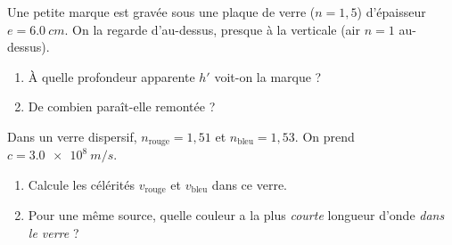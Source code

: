 \documentclass[11pt,a4paper]{article}
\begin{document}
\begin{exo}
Une petite marque est gravée sous une plaque de verre ($n=1{,}5$) d'épaisseur $e=\qty{6.0}{cm}$. On
la regarde d'au-dessus, presque à la verticale (air $n=1$ au-dessus).
\begin{enumerate}[label=\alph*)]
  \item À quelle profondeur apparente $h'$ voit-on la marque ?
  \item De combien paraît-elle remontée ?
\end{enumerate}
\end{exo}

\begin{exo}
Dans un verre dispersif, $n_{\text{rouge}}=1{,}51$ et $n_{\text{bleu}}=1{,}53$. On prend
$c=\qty{3.0e8}{m/s}$.
\begin{enumerate}[label=\alph*)]
  \item Calcule les célérités $v_{\text{rouge}}$ et $v_{\text{bleu}}$ dans ce verre.
  \item Pour une même source, quelle couleur a la plus \emph{courte} longueur d'onde \emph{dans le
        verre} ?
\end{enumerate}
\end{exo}
\end{document}
